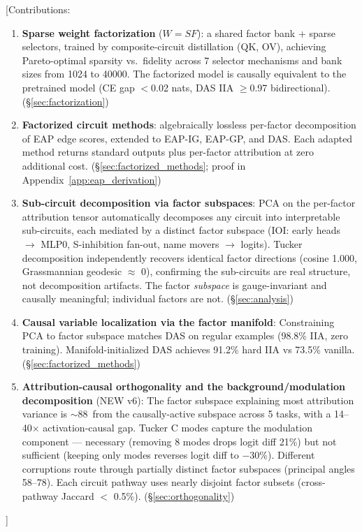 \documentclass[11pt]{article}
\begin{document}
[Contributions:
\begin{enumerate}
\item \textbf{Sparse weight factorization} ($W = SF$): a shared factor
bank + sparse selectors, trained by composite-circuit distillation
(QK, OV), achieving Pareto-optimal sparsity vs.\ fidelity across 7
selector mechanisms and bank sizes from 1024 to 40000. The factorized
model is causally equivalent to the pretrained model (CE gap $<$0.02
nats, DAS IIA $\geq$0.97 bidirectional). (\S\ref{sec:factorization})

\item \textbf{Factorized circuit methods}: algebraically lossless
per-factor decomposition of EAP edge scores, extended to EAP-IG,
EAP-GP, and DAS. Each adapted method returns standard outputs plus
per-factor attribution at zero additional cost.
(\S\ref{sec:factorized_methods}; proof in Appendix~\ref{app:eap_derivation})

\item \textbf{Sub-circuit decomposition via factor subspaces}:
PCA on the per-factor attribution tensor automatically decomposes any
circuit into interpretable sub-circuits, each mediated by a distinct
factor subspace (IOI: early heads $\to$ MLP0, S-inhibition fan-out,
name movers $\to$ logits). Tucker decomposition independently recovers
identical factor directions (cosine 1.000, Grassmannian geodesic
$\approx$ 0), confirming the sub-circuits are real structure, not
decomposition artifacts. The factor \emph{subspace} is gauge-invariant
and causally meaningful; individual factors are not.
(\S\ref{sec:analysis})

\item \textbf{Causal variable localization via the factor manifold}:
Constraining PCA to factor subspace matches DAS on regular examples
(98.8\% IIA, zero training). Manifold-initialized DAS achieves 91.2\%
hard IIA vs 73.5\% vanilla.
(\S\ref{sec:factorized_methods})

\item \textbf{Attribution-causal orthogonality and the background/modulation
decomposition} (NEW v6): The factor subspace explaining most attribution
variance is $\sim$88\textdegree\ from the causally-active subspace across
5 tasks, with a 14--40$\times$ activation-causal gap. Tucker C modes
capture the modulation component --- necessary (removing 8 modes drops
logit diff 21\%) but not sufficient (keeping only modes reverses logit
diff to $-$30\%). Different corruptions route through partially distinct
factor subspaces (principal angles 58--78\textdegree). Each circuit
pathway uses nearly disjoint factor subsets (cross-pathway Jaccard
$<$ 0.5\%). (\S\ref{sec:orthogonality})
\end{enumerate}]
\end{document}
